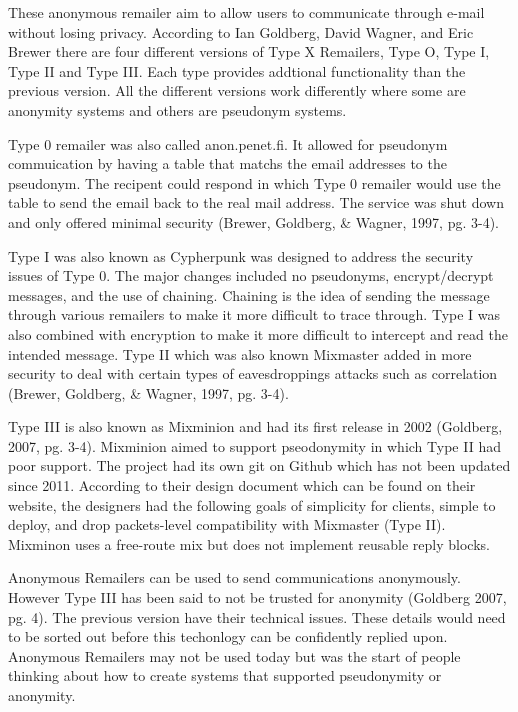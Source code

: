 \documentclass[12pt]{article}
\begin{document}
These anonymous remailer aim to allow users to communicate through e-mail without losing privacy. According to Ian Goldberg, David Wagner, and Eric Brewer there are four different versions of Type X Remailers, Type O, Type I, Type II and Type III. Each type provides addtional functionality than the previous version. All the different versions work differently where some are anonymity systems and others are pseudonym systems.

Type 0 remailer was also called anon.penet.fi. It allowed for pseudonym commuication by having a table that matchs the email addresses to the pseudonym. The recipent could respond in which Type 0 remailer would use the table to send the email back to the real mail address. The service was shut down and only offered minimal security (Brewer, Goldberg, \& Wagner, 1997, pg. 3-4).

Type I was also known as Cypherpunk was designed to address the security issues of Type 0. The major changes included no pseudonyms, encrypt/decrypt messages, and the use of chaining. Chaining is the idea of sending the message through various remailers to make it more difficult to trace through. Type I was also combined with encryption to make it more difficult to intercept and read the intended message. Type II which was also known  Mixmaster added in more security to deal with certain types of eavesdroppings attacks such as correlation (Brewer, Goldberg, \& Wagner, 1997, pg. 3-4).

Type III is also known as Mixminion and had its first release in 2002 (Goldberg, 2007, pg. 3-4). Mixminion aimed to support pseodonymity in which Type II had poor support. The project had its own git on Github which has not been updated since 2011. According to their design document which can be found on their website, the designers had the following goals of simplicity for clients, simple to deploy, and drop packets-level compatibility with Mixmaster (Type II).  Mixminon uses a free-route mix but does not implement reusable reply blocks.

Anonymous Remailers can be used to send communications anonymously. However Type III  has been said to not be trusted for anonymity (Goldberg 2007, pg. 4). The previous version have their technical issues. These details would need to be sorted out before this techonlogy can be confidently replied upon. Anonymous Remailers may not be used today but was the start of people thinking about how to create systems that supported pseudonymity or anonymity.
\end{document}
